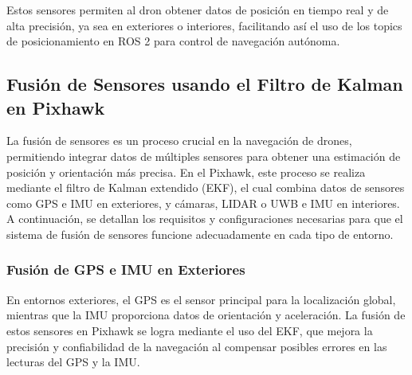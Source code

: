     Estos sensores permiten al dron obtener datos de posición en tiempo real y de alta precisión, ya sea en exteriores o interiores, facilitando así el uso de los topics de posicionamiento en ROS 2 para control de navegación autónoma.
    
\subsection{Fusión de Sensores usando el Filtro de Kalman en Pixhawk}
    La fusión de sensores es un proceso crucial en la navegación de drones, permitiendo integrar datos de múltiples sensores para obtener una estimación de posición y orientación más precisa. En el Pixhawk, este proceso se realiza mediante el filtro de Kalman extendido (EKF), el cual combina datos de sensores como GPS e IMU en exteriores, y cámaras, LIDAR o UWB e IMU en interiores. A continuación, se detallan los requisitos y configuraciones necesarias para que el sistema de fusión de sensores funcione adecuadamente en cada tipo de entorno.
    
    \subsubsection{Fusión de GPS e IMU en Exteriores}
    En entornos exteriores, el GPS es el sensor principal para la localización global, mientras que la IMU proporciona datos de orientación y aceleración. La fusión de estos sensores en Pixhawk se logra mediante el uso del EKF, que mejora la precisión y confiabilidad de la navegación al compensar posibles errores en las lecturas del GPS y la IMU.
    
